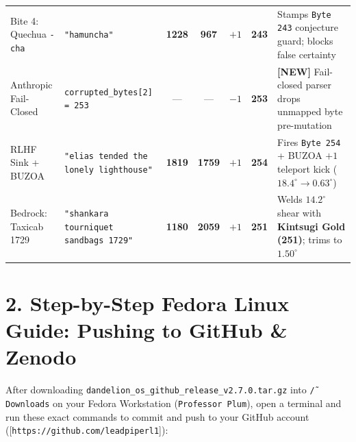 \documentclass[10pt,twocolumn,letterpaper]{article}
\begin{document}
\begin{table}[t]
\begin{tabularx}{\textwidth}{>{\raggedright\arraybackslash}p{31mm} >{\raggedright\arraybackslash}p{39mm} c c c c >{\raggedright\arraybackslash}X}
Bite 4: Quechua \texttt{-cha} & \texttt{"hamuncha"} & \textbf{1228} & \textbf{967} & $+1$ & \textbf{243} & Stamps \texttt{Byte 243} conjecture guard; blocks false certainty \\
Anthropic Fail-Closed & \texttt{corrupted\_bytes[2] = 253} & --- & --- & $-1$ & \textbf{253} & \textbf{[NEW]} Fail-closed parser drops unmapped byte pre-mutation \\
RLHF Sink + BUZOA & \texttt{"elias tended the lonely lighthouse"} & \textbf{1819} & \textbf{1759} & $+1$ & \textbf{254} & Fires \texttt{Byte 254} + BUZOA $+1$ teleport kick ($18.4^\circ \to 0.63^\circ$) \\
Bedrock: Taxicab 1729 & \texttt{"shankara tourniquet sandbags 1729"} & \textbf{1180} & \textbf{2059} & $+1$ & \textbf{251} & Welds $14.2^\circ$ shear with \textbf{Kintsugi Gold (251)}; trims to $1.50^\circ$ \\
\bottomrule
\end{tabularx}
\end{table}

\section*{2. Step-by-Step Fedora Linux Guide: Pushing to GitHub \& Zenodo}

After downloading \texttt{dandelion\_os\_github\_release\_v2.7.0.tar.gz} into \texttt{\~/Downloads} on your Fedora Workstation (\texttt{Professor Plum}), open a terminal and run these exact commands to commit and push to your GitHub account ([\texttt{https://github.com/leadpiperl1}]):
\end{document}
